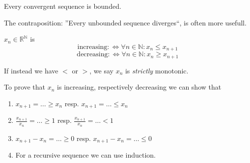 \begin{theorem}\label{thm:conv_bound}
   Every convergent sequence is bounded.
\end{theorem}
\begin{remark}
   The contraposition: ''Every unbounded sequence diverges``, is often more usefull.
\end{remark}

\begin{definition}
   \(x_n \in \mathbb{R}^\mathbb{N}\) is
   \[\text{increasing} :\iff \forall n \in \mathbb{N}: x_n \leq x_{n+1}\]
   \[\text{decreasing} :\iff \forall n \in \mathbb{N}: x_n \geq x_{n+1}\]
\end{definition}
\begin{remark}[Terminology]
   If instead we have \(<\) or \(>\), we say \(x_n\) is \emph{strictly} monotonic.
\end{remark}
\begin{remark}[Tips]
   To prove that \(x_n\) is increasing, respectively decreasing we can show that
   \begin{enumerate}
      \item \(x_{n+1} = \ldots \geq x_n\) resp. \(x_{n+1} = \ldots \leq x_n\)
      \item \(\frac{x_{n+1}}{x_n} = \ldots \geq 1\) resp. \(\frac{x_{n+1}}{x_n} = \ldots < 1\)
      \item \(x_{n+1} - x_n = \ldots \geq 0\) resp. \(x_{n+1} - x_n = \ldots \leq 0\)
      \item For a recursive sequence we can use induction.
   \end{enumerate}
\end{remark}

